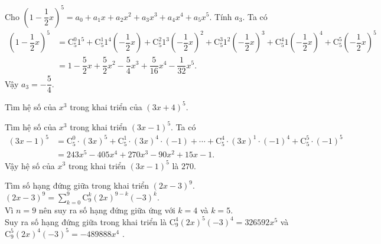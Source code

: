\begin{bt}%
Cho $\left(1-\dfrac{1}{2}x\right)^5 = a_0+a_1x+a_2x^2+a_3x^3+a_4x^4+a_5x^5$. Tính $a_3$.
\loigiai
{Ta có 
\begin{align*}
\left(1-\dfrac{1}{2}x\right)^5 &= \mathrm{C}_5^0 1^5 + \mathrm{C}_5^1 1^4 \left(-\dfrac{1}{2}x\right)+ \mathrm{C}_5^2 1^3 \left(-\dfrac{1}{2}x\right)^2+ \mathrm{C}_5^3 1^2 \left(-\dfrac{1}{2}x\right)^3+ \mathrm{C}_5^4 1 \left(-\dfrac{1}{2}x\right)^4+ \mathrm{C}_5^5 \left(-\dfrac{1}{2}x\right)^5\\&= 1-\dfrac{5}{2}x+\dfrac{5}{2}x^2-\dfrac{5}{4}x^3+\dfrac{5}{16}x^4-\dfrac{1}{32}x^5.
\end{align*}
Vậy $a_3=-\dfrac{5}{4}$.
}
\end{bt}

\begin{bt}%
	Tìm hệ số của $x^{3}$ trong khai triển của $(3x+4)^{5}$.
\end{bt}

\begin{bt}%
Tìm hệ số của $x^3$ trong khai triển $\left(3x-1\right)^5$.
\loigiai
{
Ta có
$$\begin{aligned}
\left(3x-1\right)^5
&=\mathrm{C}_5^0\cdot(3x)^5+\mathrm{C}_5^1\cdot(3x)^4\cdot(-1)+\cdots+\mathrm{C}_5^4\cdot(3x)^1\cdot(-1)^4+\mathrm{C}_5^5\cdot(-1)^5 \\
&=243x^5-405x^4+270x^3-90x^2+15x-1.
\end{aligned}$$
Vậy hệ số của $x^3$ trong khai triển $\left(3x-1\right)^5$ là $270$.
}
\end{bt}

\begin{bt}%
    Tìm số hạng đứng giữa trong khai triển $(2x-3)^9$.
    \loigiai
    {
        $(2x-3)^9=\sum\limits_{k=0}^{9}\mathrm{C}_9^k (2x)^{9-k}(-3)^k$.\\
        Vì $ n=9 $ nên suy ra số hạng đứng giữa ứng với $ k=4 $ và $ k=5 $.\\
        Suy ra số hạng đứng giữa trong khai triển là $ \mathrm{C}_9^4 (2x)^5(-3)^4= 326592x^5$ và  $\mathrm{C}_9^5 (2x)^4(-3)^5= -489888x^4$ .
    }
\end{bt}

